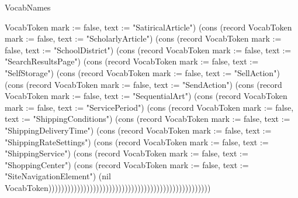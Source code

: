 \begin{lexlean}{VocabNames}
\begin{semanticmodule}
{VocabToken {mark := false, text := "SatiricalArticle"}) (cons (record VocabToken {mark := false, text := "ScholarlyArticle"}) (cons (record VocabToken {mark := false, text := "SchoolDistrict"}) (cons (record VocabToken {mark := false, text := "SearchResultsPage"}) (cons (record VocabToken {mark := false, text := "SelfStorage"}) (cons (record VocabToken {mark := false, text := "SellAction"}) (cons (record VocabToken {mark := false, text := "SendAction"}) (cons (record VocabToken {mark := false, text := "SequentialArt"}) (cons (record VocabToken {mark := false, text := "ServicePeriod"}) (cons (record VocabToken {mark := false, text := "ShippingConditions"}) (cons (record VocabToken {mark := false, text := "ShippingDeliveryTime"}) (cons (record VocabToken {mark := false, text := "ShippingRateSettings"}) (cons (record VocabToken {mark := false, text := "ShippingService"}) (cons (record VocabToken {mark := false, text := "ShoppingCenter"}) (cons (record VocabToken {mark := false, text := "SiteNavigationElement"}) (nil VocabToken)))))))))))))))))))))))))))))))))))))))))))))))))))
}


\end{semanticmodule}
\end{lexlean}

